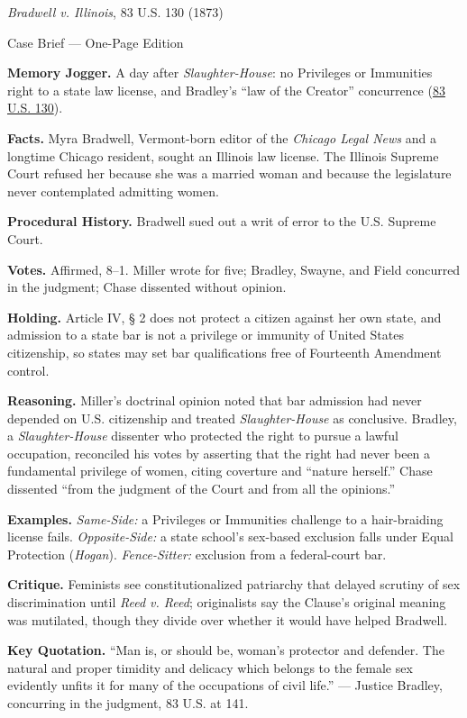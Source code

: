 \documentclass[12pt]{article}
\begin{document}
\begin{center}
{\Large \textit{Bradwell v. Illinois}, 83 U.S. 130 (1873)\par}
\vspace{0.3em}
{\normalsize Case Brief --- One-Page Edition\par}
\end{center}

\textbf{Memory Jogger.} A day after \textit{Slaughter-House}: no Privileges or Immunities right to a state law license, and Bradley's ``law of the Creator'' concurrence (\href{https://supreme.justia.com/cases/federal/us/83/130/}{83 U.S. 130}).

\textbf{Facts.} Myra Bradwell, Vermont-born editor of the \textit{Chicago Legal News} and a longtime Chicago resident, sought an Illinois law license. The Illinois Supreme Court refused her because she was a married woman and because the legislature never contemplated admitting women.

\textbf{Procedural History.} Bradwell sued out a writ of error to the U.S. Supreme Court.

\textbf{Votes.} Affirmed, 8--1. Miller wrote for five; Bradley, Swayne, and Field concurred in the judgment; Chase dissented without opinion.

\textbf{Holding.} Article IV, \S{} 2 does not protect a citizen against her own state, and admission to a state bar is not a privilege or immunity of United States citizenship, so states may set bar qualifications free of Fourteenth Amendment control.

\textbf{Reasoning.} Miller's doctrinal opinion noted that bar admission had never depended on U.S. citizenship and treated \textit{Slaughter-House} as conclusive. Bradley, a \textit{Slaughter-House} dissenter who protected the right to pursue a lawful occupation, reconciled his votes by asserting that the right had never been a fundamental privilege of women, citing coverture and ``nature herself.'' Chase dissented ``from the judgment of the Court and from all the opinions.''

\textbf{Examples.} \emph{Same-Side:} a Privileges or Immunities challenge to a hair-braiding license fails. \emph{Opposite-Side:} a state school's sex-based exclusion falls under Equal Protection (\textit{Hogan}). \emph{Fence-Sitter:} exclusion from a federal-court bar.

\textbf{Critique.} Feminists see constitutionalized patriarchy that delayed scrutiny of sex discrimination until \textit{Reed v. Reed}; originalists say the Clause's original meaning was mutilated, though they divide over whether it would have helped Bradwell.

\textbf{Key Quotation.} ``Man is, or should be, woman's protector and defender. The natural and proper timidity and delicacy which belongs to the female sex evidently unfits it for many of the occupations of civil life.'' --- Justice Bradley, concurring in the judgment, 83 U.S. at 141.
\end{document}
